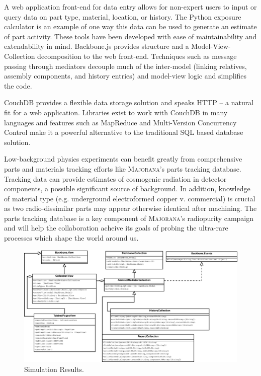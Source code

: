 \documentclass[journal]{IEEEtran}
\begin{document}
A web application front-end for data entry allows for non-expert users to input
or query data on part type, material, location, or history. The Python exposure
calculator is an example of one way this data can be used to generate an estimate
of part activity. These tools have been developed with ease of maintainability and
extendability in mind. Backbone.js provides structure and a Model-View-Collection
decomposition to the web front-end. Techniques such as message passing through mediators
decouple much of the inter-model (linking relatives, assembly components, and history entries)
and model-view logic and simplifies the code.

CouchDB provides a flexible data storage solution and speaks HTTP -- a natural
fit for a web application. Libraries exist to work with CouchDB in many languages and
features such as MapReduce and Multi-Version Concurrency Control make it a powerful
alternative to the traditional SQL based database solution.

Low-background physics experiments can benefit greatly from comprehensive
parts and materials tracking efforts like \textsc{Majorana}'s parts tracking database.
Tracking data can provide estimates of cosmogenic radiation in detector components,
a possible significant source of background. In addition, knowledge of material type
(e.g. underground electroformed copper v. commercial) is crucial as two radio-dissimilar 
parts may appear otherwise identical after machining. The parts tracking database is a 
key component of \textsc{Majorana}'s radiopurity campaign and will help the collaboration acheive
its goals of probing the ultra-rare processes which shape the world around us.

\begin{figure}[!p]
\centering
\includegraphics[width=7.5in]{Singletons}
\caption{Simulation Results.}
\label{singletons}
\end{figure}
\end{document}
